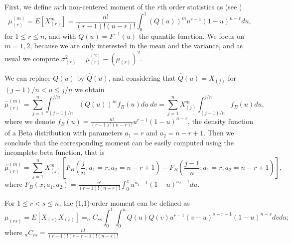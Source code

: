 \documentclass[preprint,12pt]{elsarticle}
\begin{document}
First, we define $m$th non-centered moment of the $r$th order statistics as (see \cite{ABN08})
\begin{equation}\label{mu.r}
\mu_{(r)}^{(m)}=E\left[X_{(r)}^m\right]=\frac{n!}{(r-1)!(n-r)!}\int_0^1(Q(u))^m u^{r-1}(1-u)^{n-r}du,
\end{equation}
for $1\leq r \leq n$, and with $Q(u)=F^{-1}(u)$ the quantile function. We focus on $m=1,2$, because we are only interested in the mean and the variance, and as usual we compute $\sigma_{(r)}^2=\mu_{(r)}^{(2)}-\left(\mu_{(r)}\right)^2$.  
\vskip 0.5cm

We can replace $ Q(u)$ by $\widehat{Q}(u)$, and considering that $\widehat{Q}(u)= X_{(j)}$ for $(j-1)/n < u \leq j/n$ we obtain
\begin{equation}\label{mu.hat}
\widehat{\mu}_{(r)}^{(m)}=\sum_{j=1}^n\int_{(j-1)/n}^{j/n}(Q(u))^m f_B(u)du \ dv=\sum_{j=1}^n X_{(j)}^m\int_{(j-1)/n}^{j/n} f_B(u)du,
\end{equation}
where we denote $f_B(u)=\frac{n!}{(r-1)!(n-r)!} u^{r-1}(1-u)^{n-r}$, the density function of a Beta distribution with parameters $a_1=r$ and $a_2=n-r+1$. Then we conclude that the corresponding moment can be easily computed using the incomplete beta function, that is
\begin{equation}%
\widehat{\mu}_{(r)}^{(m)}=\sum_{j=1}^n X_{(j)}^m\left[F_B\left(\frac{j}{n};a_1=r,a_2=n-r+1\right)-F_B\left(\frac{j-1}{n};a_1=r,a_2=n-r+1\right)\right],
\end{equation}
where $F_B(x;a_1,a_2)=\frac{n!}{(r-1)!(n-r)!}\int_0^x u^{a_1-1}(1-u)^{a_2-1} du$.
\bigskip

For $1 \leq r < s \leq n$, the (1,1)-order moment can be defined as 
\begin{equation}\label{mu.rs}
\mu_{(rs)}=E\left[X_{(r)}X_{(s)}\right]= _nC_{rs} \int_0^1\int_0^{u} Q(u)Q(v) u^{r-1}(v-u)^{s-r-1}(1-u)^{n-s}dvdu;
\end{equation}
where $_nC_{rs}=\frac{n!}{(r-1)!(s-r-1)!(n-s)!}$
\end{document}

